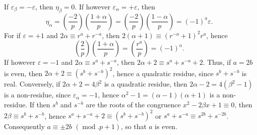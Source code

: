 \documentclass[11pt]{article}
\begin{document}
If $\varepsilon_\beta=-\varepsilon$, then $\eta_\beta=0$. If however $\varepsilon_\alpha=+\varepsilon$, then
\begin{equation*}\tag{7.}
\eta_\alpha=
\left(\frac{-2}{p}\right)\left(\frac{1+\alpha}{p}\right)
=
\left(\frac{-2}{p}\right)\left(\frac{1-\alpha}{p}\right)
=(-1)^a\varepsilon.
\end{equation*}
For if $\varepsilon=+1$ and $2\alpha\equiv r^a+r^{-a}$, then $2(\alpha+1)\equiv(r^{-a}+1)^2r^a$, hence
\[
\left(\frac{2}{p}\right)\left(\frac{1+\alpha}{p}\right)=\left(\frac{r^a}{p}\right)=(-1)^a.
\]
If however $\varepsilon=-1$ and $2\alpha\equiv s^a+s^{-a}$, then $2\alpha+2\equiv s^a+s^{-a}+2$. Thus, if $a=2b$ is even, then $2\alpha+2\equiv(s^b+s^{-b})^2$, hence a quadratic residue, since $s^b+s^{-b}$ is real. Conversely, if $2\alpha+2=4\beta^2$ is a quadratic residue, then $2\alpha-2=4(\beta^2-1)$ is a non-residue, since $\varepsilon_\alpha=-1$, hence $\alpha^2-1=(\alpha-1)(\alpha+1)$ is a non-residue. If then $s^b$ and $s^{-b}$ are the roots of the congruence $x^2-2\beta x+1\equiv0$, then $2\beta\equiv s^b+s^{-b}$, hence $s^a+s^{-a}+2\equiv(s^b+s^{-b})^2$ or $s^a+s^{-a}\equiv s^{2b}+s^{-2b}$. Consequently $a\equiv\pm2b$ $(\operatorname{mod}.p+1)$, so that $a$ is even.
\end{document}
